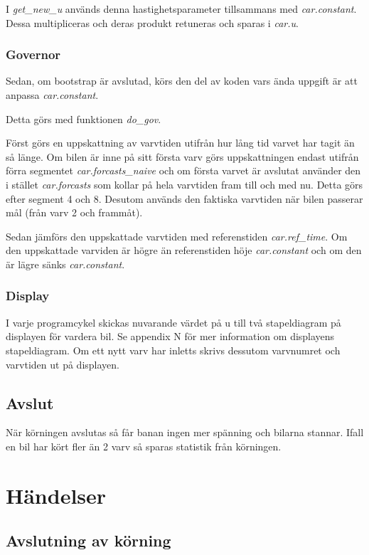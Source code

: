 \documentclass[10pt,oneside,swedish]{lips-no_customer}
\begin{document}
I \emph{get\_new\_u} används denna hastighetsparameter tillsammans med
\emph{car.constant}. Dessa multipliceras och deras produkt retuneras och sparas
i \emph{car.u}.

\subsubsection{Governor}

Sedan, om bootstrap är avslutad, körs den del av koden vars ända uppgift är att 
anpassa \emph{car.constant}. 

Detta görs med funktionen \emph{do\_gov}. 

Först görs en uppskattning av varvtiden utifrån hur lång tid varvet har tagit än
så länge. Om bilen är inne på sitt första varv görs uppskattningen endast
utifrån förra segmentet \emph{car.forcasts\_naive} och om första varvet är
avslutat använder den i stället \emph{car.forcasts} som kollar på hela varvtiden
fram till och med nu. Detta görs efter segment 4 och 8. Desutom används den
faktiska varvtiden när bilen passerar mål (från varv 2 och frammåt).
 
Sedan jämförs den uppskattade varvtiden med referenstiden \emph{car.ref\_time}.
Om den uppskattade varviden är högre än referenstiden höje \emph{car.constant}
och om den är lägre sänks \emph{car.constant}.

\subsubsection{Display}

I varje programcykel skickas nuvarande värdet på u till två stapeldiagram på
displayen för vardera bil. Se appendix N för mer information om displayens
stapeldiagram. Om ett nytt varv har inletts skrivs dessutom varvnumret och
varvtiden ut på displayen.

\subsection{Avslut}

När körningen avslutas så får banan ingen mer spänning och bilarna stannar.
Ifall en bil har kört fler än 2 varv så sparas statistik från körningen. 

\section{Händelser}

\subsection{Avslutning av körning}
\end{document}
